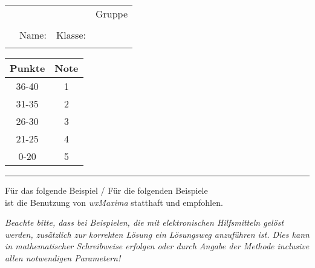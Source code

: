 \documentclass[10pt,a4paper]{article}
\makeatletter
\newcommand{\myID}{\@ID}
\newcommand{\myDate}{\@Date}
\newcommand{\myTitle}{\@Title}
\newcommand{\myClass}{\@Class}
\newcommand{\myTableDir}{\@TableDir}
\newcommand{\myEnumStartAt}{\@EnumStartAt}
\makeatother
\begin{document}
\thispagestyle{empty}
{\sf

\begin{table}
\begin{tabularx}{\linewidth}{rXXl}
		                  & \large{\textbf{\myTitle}} & \large{\myDate} & \large{Gruppe \myID}  \\[1mm]
		\huge{\myClass}	  &								            &  			          &				                \\[1mm]
		                  & \large{Name:}							& \large{Klasse:} &				                \\
		\\
\end{tabularx}
\end{table}


\hfill
\begin{tabular}{|c|c|}
  \hline
  Punkte  & Note  \\ \hline
  36-40   & 1     \\ \hline
  31-35   & 2     \\ \hline
  26-30   & 3     \\ \hline
  21-25   & 4     \\ \hline
  0-20    & 5     \\ \hline
\end{tabular}

\hrule

\vspace*{5mm}

\begin{tcolorbox}[arc=0mm,  standard jigsaw, opacityback=0, boxrule=1pt]
\begin{center}
Für das folgende Beispiel / Für die folgenden Beispiele \\
ist die Benutzung von \textit{wxMaxima} statthaft und empfohlen.
\end{center}
\end{tcolorbox}

\begin{tcolorbox}[arc=0mm,  standard jigsaw, opacityback=0, boxrule=1pt]
\textit{Beachte bitte, dass bei Beispielen, die mit elektronischen Hilfsmitteln gelöst werden,
zusätzlich zur korrekten Lösung ein Lösungsweg anzuführen ist.
Dies kann in mathematischer Schreibweise erfolgen oder durch Angabe der Methode
inclusive allen notwendigen Parametern!}
\end{tcolorbox}

}
\newpage

\begin{enumerate}[leftmargin=*]
\setcounter{enumi}{\myEnumStartAt}


\end{enumerate}
\end{document}
